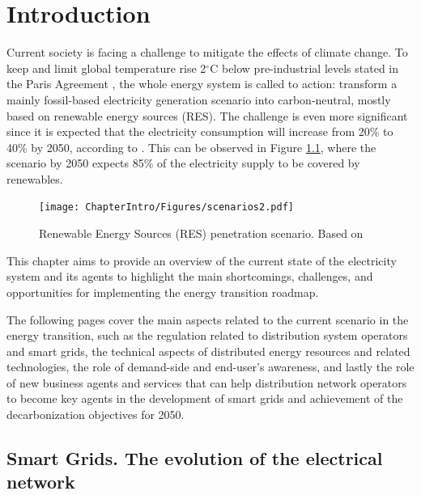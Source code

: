 \renewcommand\labelenumi{(\roman{enumi})}
\renewcommand\theenumi\labelenumi

\chapter{Introduction}
\label{chapterIntro}

Current society is facing a challenge to mitigate the effects of climate change. To keep and limit global temperature rise 2$^{\circ}$C below pre-industrial levels stated in the Paris Agreement \cite{IPCC2018}, the whole energy system is called to action: transform a mainly fossil-based electricity generation scenario into carbon-neutral, mostly based on renewable energy sources (RES). The challenge is even more significant since it is expected that the electricity consumption will increase from 20\% to 40\% by 2050, according to \cite{IRENA2018}. This can be observed in Figure \ref{fig:scenarios}, where the scenario by 2050 expects 85\% of the electricity supply to be covered by renewables. 

\begin{figure}[htbp]
	\centering 
	\texttt{[image: ChapterIntro/Figures/scenarios2.pdf]}
		\caption{Renewable Energy Sources (RES) penetration scenario. Based on \cite{IRENA2018}}  
		\label{fig:scenarios}
\end{figure}
\newpage
This chapter aims to provide an overview of the current state of the electricity system and its agents to highlight the main shortcomings, challenges, and opportunities for implementing the energy transition roadmap. 

The following pages cover the main aspects related to the current scenario in the energy transition, such as the regulation related to distribution system operators and smart grids, the technical aspects of distributed energy resources and related technologies, the role of demand-side and end-user's awareness, and lastly the role of new business agents and services that can help distribution network operators to become key agents in the development of smart grids and achievement of the decarbonization objectives for 2050. 


\section{Smart Grids. The evolution of the electrical network}

